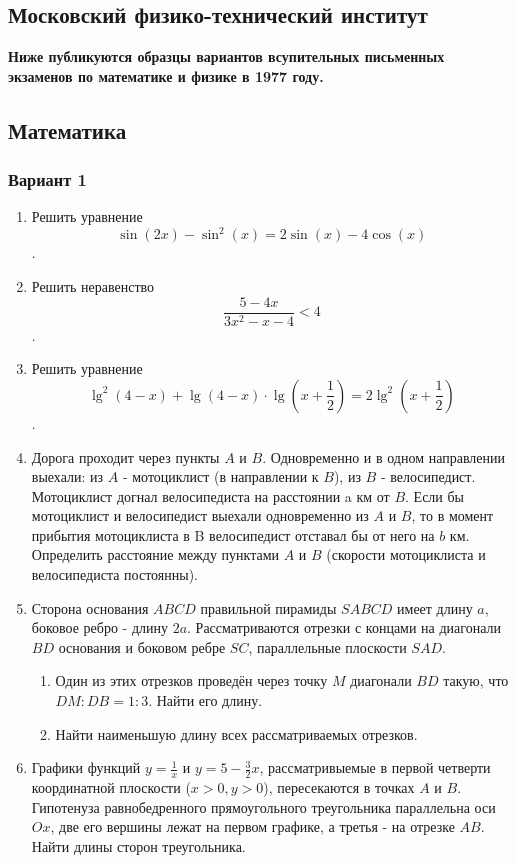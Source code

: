 \documentclass{article}
\author{Ponomaryov Mikhail}
\date{December 2022}
\begin{document}
\setlength{\abovedisplayskip}{10pt} %
\setlength{\belowdisplayskip}{-2pt} %

\begin{paracol}{2}

\begin{flushleft}

\section*{Московский физико-технический институт}
\textbf{Ниже публикуются образцы вариантов всупительных письменных экзаменов по математике и физике в 1977 году.}

\subsection*{Математика}

\subsubsection*{Вариант 1}
\begin{enumerate}
    \item Решить уравнение 
    \[\sin(2x)-\sin^2(x)=2\sin(x)-4\cos(x)\].
    \item Решить неравенство
    \[\frac{5-4x}{3x^2-x-4}<4\].
    \item Решить уравнение 
    \[\lg^2(4-x)+\lg(4-x)\cdot\lg(x+\frac{1}{2})=2\lg^2(x+\frac{1}{2})\].
    \item Дорога проходит через пункты $A$ и $B$. Одновременно и в одном направлении
    выехали: из $A$ - мотоциклист (в направлении к $B$), из $B$ - велосипедист.
    Мотоциклист догнал велосипедиста на расстоянии a км от $B$. Если бы мотоциклист и велосипедист выехали одновременно из $A$ и $B$, то в момент прибытия мотоциклиста в B велосипедист отставал бы от него на $b$ км.
    Определить расстояние между пунктами $A$ и $B$ (скорости мотоциклиста и велосипедиста постоянны).
    \item Сторона основания $ABCD$ правильной пирамиды $SABCD$ имеет длину $a$, боковое ребро - длину $2a$. Рассматриваются отрезки с концами на диагонали $BD$ основания и боковом ребре $SC$, параллельные плоскости $SAD$.
    \begin{enumerate}
        \item Один из этих отрезков проведён через точку $M$ диагонали $BD$ такую, что $DM:DB=1:3$. Найти его длину.
        \item Найти наименьшую длину всех рассматриваемых отрезков.
    \end{enumerate}
    \item Графики функций $y = \frac{1}{x}$ и $y = 5 - \frac{3}{2} x$,                рассматривыемые в первой четверти координатной плоскости ($x > 0, y > 0$),       пересекаются в точках $A$ и $B$. Гипотенуза равнобедренного прямоугольного       треугольника параллельна оси $Ox$, две его вершины лежат на первом графике, а третья - на отрезке $AB$. Найти длины сторон треугольника.
\end{enumerate}


\end{flushleft}
\end{paracol}
\end{document}
